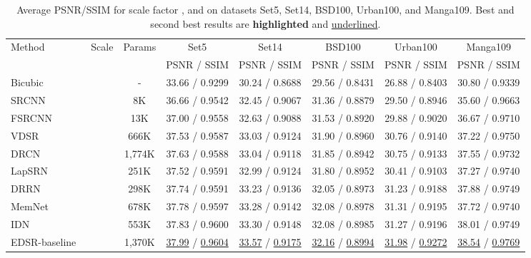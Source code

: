 \documentclass[sigconf]{acmart}
\begin{document}
\begin{table*}[htpb]
	\caption{Average PSNR/SSIM for scale factor ,  and  on datasets Set5, Set14, BSD100, Urban100, and Manga109. Best and second best results are \textbf{highlighted} and \underline{underlined}.}
	\centering
	\begin{tabular}{|l|c|c|c|c|c|c|c|}
		\hline
		\multirow{2}{*}{Method} & \multirow{2}{*}{Scale} & \multirow{2}{*}{Params} & Set5 & Set14 & BSD100 & Urban100 & Manga109 \\
		\cline{4-8}
		& & & PSNR / SSIM & PSNR / SSIM & PSNR / SSIM & PSNR / SSIM & PSNR / SSIM \\
		\hline
		\hline
Bicubic & \multirow{13}{*}{} & - &33.66 / 0.9299 & 30.24 / 0.8688 & 29.56 / 0.8431 & 26.88 / 0.8403 & 30.80 / 0.9339 \\
		
		SRCNN~\cite{SRCNN} & & 8K & 36.66 / 0.9542 & 32.45 / 0.9067 & 31.36 / 0.8879 & 29.50 / 0.8946 & 35.60 / 0.9663 \\
		
		FSRCNN~\cite{FSRCNN} & & 13K & 37.00 / 0.9558 & 32.63 / 0.9088 & 31.53 / 0.8920 & 29.88 / 0.9020 & 36.67 / 0.9710 \\
		
		VDSR~\cite{VDSR} & & 666K & 37.53 / 0.9587 & 33.03 / 0.9124 & 31.90 / 0.8960 & 30.76 / 0.9140 & 37.22 / 0.9750 \\
		
		DRCN~\cite{DRCN} &  & 1,774K & 37.63 / 0.9588 & 33.04 / 0.9118 & 31.85 / 0.8942 & 30.75 / 0.9133 & 37.55 / 0.9732 \\
		
		LapSRN~\cite{LapSRN} &  & 251K & 37.52 / 0.9591 & 32.99 / 0.9124 & 31.80 / 0.8952 & 30.41 / 0.9103 & 37.27 / 0.9740 \\
		
		DRRN~\cite{DRRN} &  & 298K & 37.74 / 0.9591 & 33.23 / 0.9136 & 32.05 / 0.8973 & 31.23 / 0.9188 & 37.88 / 0.9749 \\
		
		MemNet~\cite{MemNet} &  & 678K & 37.78 / 0.9597 & 33.28 / 0.9142 & 32.08 / 0.8978 & 31.31 / 0.9195 & 37.72 / 0.9740 \\
		
		IDN~\cite{IDN} &  & 553K & 37.83 / 0.9600 & 33.30 / 0.9148 & 32.08 / 0.8985 & 31.27 / 0.9196 & 38.01 / 0.9749 \\
		
		EDSR-baseline~\cite{EDSR} &  & 1,370K &\underline{37.99} / \underline{0.9604} & \underline{33.57} / \underline{0.9175} & \underline{32.16} / \underline{0.8994} & \underline{31.98} / \underline{0.9272} & \underline{38.54} / \underline{0.9769} \\
		

\end{tabular}
\end{table*}
\end{document}
